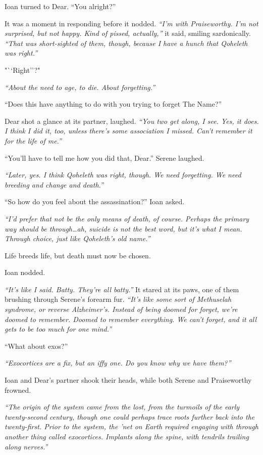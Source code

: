 Ioan turned to Dear. ``You alright?''

It was a moment in responding before it nodded. \emph{``I'm with Praiseworthy. I'm not surprised, but not happy. Kind of pissed, actually,''} it said, smiling sardonically. \emph{``That was short-sighted of them, though, because I have a hunch that Qoheleth was right.''}

"``Right''?"

\emph{``About the need to age, to die. About forgetting.''}

``Does this have anything to do with you trying to forget The Name?''

Dear shot a glance at its partner, laughed. \emph{``You two get along, I see. Yes, it does. I think I did it, too, unless there's some association I missed. Can't remember it for the life of me.''}

``You'll have to tell me how you did that, Dear.'' Serene laughed.

\emph{``Later, yes. I think Qoheleth was right, though. We need forgetting. We need breeding and change and death.''}

``So how do you feel about the assassination?'' Ioan asked.

\emph{``I'd prefer that not be the only means of death, of course. Perhaps the primary way should be through\ldots{}ah, suicide is not the best word, but it's what I mean. Through choice, just like Qoheleth's old name.''}

Life breeds life, but death must now be chosen.

Ioan nodded.

\emph{``It's like I said. Batty. They're all batty.''} It stared at its paws, one of them brushing through Serene's forearm fur. \emph{``It's like some sort of Methuselah syndrome, or reverse Alzheimer's. Instead of being doomed for forget, we're doomed to remember. Doomed to remember everything. We can't forget, and it all gets to be too much for one mind.''}

``What about exos?''

\emph{``Exocortices are a fix, but an iffy one. Do you know why we have them?''}

Ioan and Dear's partner shook their heads, while both Serene and Praiseworthy frowned.

\emph{``The origin of the system came from the lost, from the turmoils of the early twenty-second century, though one could perhaps trace roots further back into the twenty-first. Prior to the system, the 'net on Earth required engaging with through another thing called exocortices. Implants along the spine, with tendrils trailing along nerves.''}

